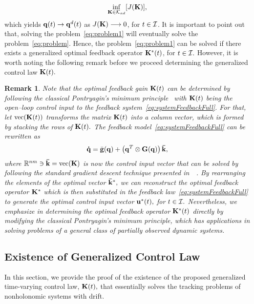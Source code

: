 \documentclass[
12pt,draftcls,onecolumn%
]{IEEEtran}
\newtheorem{remark}{Remark}
\begin{document}
\begin{equation}
\inf_{{\bf K}\in{\cal K}_{ad}} [J({\bf K})],
\label{eq:problem1}
\end{equation}
which yields ${\bf q}(t) \to {\bf q}^d(t)$ as $J({\bf K})\longrightarrow 0$, for $t\in {\cal I}$. It is important to point out that, solving the problem~\eqref{eq:problem1} will eventually solve  the problem~\eqref{eq:problem}. Hence, the problem~\eqref{eq:problem1} can be solved if there exists a generalized optimal feedback operator ${\bf K}^*(t)$, for $t\in {\cal I}.$ However, it is worth noting the following remark before we proceed determining the generalized control law ${\bf K}(t).$ 
%

\begin{remark}
Note that the optimal feedback gain ${\bf K}(t)$ can be determined by following the classical Pontryagin's minimum principle~\cite[Chaper~8]{Ahmed2006} with ${\bf K}(t)$ being the open--loop control input to the feedback system~\eqref{eq:systemFeedbackFull}. For that, let $\mathrm{vec}({\bf K}(t))$ transforms the matrix ${\bf K}(t)$ into a column vector, which is formed by stacking the rows of ${\bf K}(t).$ The feedback model~\eqref{eq:systemFeedbackFull} can be rewritten as 
\begin{equation}
  {\bf \dot q} = \bar{{\bf g}}({\bf q}) + \left({\bf q}^T\otimes{\bf G}({\bf q})\right){\bf \bar k},
  \label{eq:systemFeedbackFull1}  
\end{equation}
where $\mathbb{R}^{nm}\ni{\bf \bar k}=\mathrm{vec}({\bf K})$ is now the control input vector that can be solved by following the standard gradient descent technique presented in~\cite[Chapter~3]{Stengel1994}~\cite[Chaper~8]{Ahmed2006}. By rearranging the elements of the optimal vector ${\bf \bar k}^*,$ we can reconstruct the optimal feedback operator ${\bf K}^*$ which is then substituted in the feedback law~\eqref{eq:systemFeedbackFull} to generate the optimal control input vector ${\bf u}^*(t),$ for $t\in{\cal I}.$  Nevertheless,  we emphasize in determining the optimal feedback operator ${\bf K}^*(t)$ directly by modifying the classical Pontryagin's minimum principle, which has applications in solving problems of a general class of partially observed dynamic systems. 
\end{remark}


\subsection{Existence of Generalized Control Law}
In this section, we provide the proof of the existence of the proposed generalized time-varying control law, ${\bf K}(t),$ that essentially solves the tracking problems of nonholonomic systems with drift. 
\end{document}
